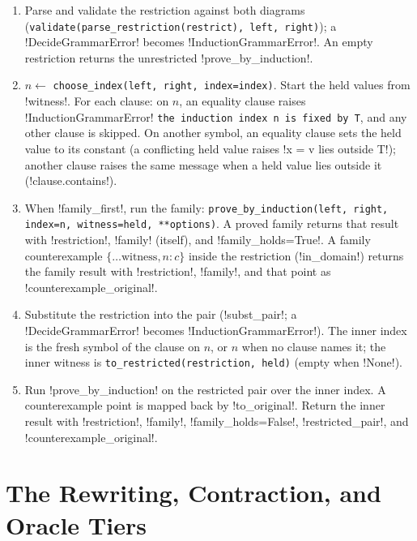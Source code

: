 \begin{algorithm}\label{alg:kernel-restricted}
\begin{enumerate}
\item Parse and validate the restriction against both diagrams (\texttt{validate(\allowbreak{}parse\_\allowbreak{}restriction(\allowbreak{}restrict),\allowbreak{} left,\allowbreak{} right)}); a \py!DecideGrammarError! becomes \py!InductionGrammarError!. An empty restriction returns the unrestricted \py!prove_by_induction!.
\item $n\gets$ \texttt{choose\_\allowbreak{}index(\allowbreak{}left,\allowbreak{} right,\allowbreak{} index=index)}. Start the held values from \code!witness!. For each clause: on $n$, an equality clause raises \py!InductionGrammarError! \texttt{the induction index n is fixed by T}, and any other clause is skipped. On another symbol, an equality clause sets the held value to its constant (a conflicting held value raises \code!x = v lies outside T!); another clause raises the same message when a held value lies outside it (\py!clause.contains!).
\item When \code!family_first!, run the family: \texttt{prove\_\allowbreak{}by\_\allowbreak{}induction(\allowbreak{}left,\allowbreak{} right,\allowbreak{} index=n,\allowbreak{} witness=held,\allowbreak{} **options)}. A proved family returns that result with \py!restriction!, \py!family! (itself), and \py!family_holds=True!. A family counterexample $\{\ldots\text{witness}, n: c\}$ inside the restriction (\py!in_domain!) returns the family result with \py!restriction!, \py!family!, and that point as \py!counterexample_original!.
\item Substitute the restriction into the pair (\py!subst_pair!; a \py!DecideGrammarError! becomes \py!InductionGrammarError!). The inner index is the fresh symbol of the clause on $n$, or $n$ when no clause names it; the inner witness is \texttt{to\_\allowbreak{}restricted(\allowbreak{}restriction,\allowbreak{} held)} (empty when \py!None!).
\item Run \py!prove_by_induction! on the restricted pair over the inner index. A counterexample point is mapped back by \py!to_original!. Return the inner result with \py!restriction!, \py!family!, \py!family_holds=False!, \py!restricted_pair!, and \py!counterexample_original!.
\end{enumerate}
\end{algorithm}

\section{The Rewriting, Contraction, and Oracle Tiers}\label{sec:kernel-tiers}


